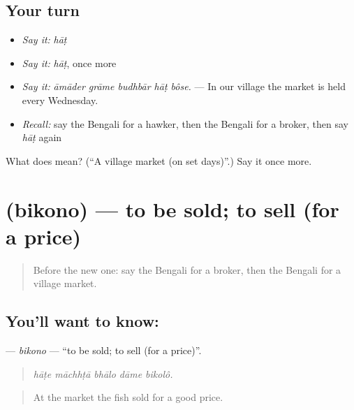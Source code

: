 \subsection*{Your turn}
\begin{itemize}
\raggedright
  \item \emph{Say it:} \emph{hāṭ}
  \item \emph{Say it:} \emph{hāṭ}, once more
  \item \emph{Say it:} \emph{āmāder grāme budhbār hāṭ bôse.} — In our village the market is held every Wednesday.
  \item \emph{Recall:} say the Bengali for a hawker, then the Bengali for a broker, then say \emph{hāṭ} again
\end{itemize}

\begin{tcolorbox}[breakable,colback=teal!4,colframe=teal!35!black,title={Before you move on}]
What does  mean? (\textquotedblleft{}A village market (on set days)\textquotedblright{}.) Say it once more.
\end{tcolorbox}
\section[\texorpdfstring{\bn{বিকোনো} (bikono)}{বিকোনো (bikono)}]{ (bikono) — to be sold; to sell (for a price)}

\label{lesson:BN-C420-bikono}



\begin{quote}
Before the new one: say the Bengali for a broker, then the Bengali for a village market.
\end{quote}

\subsection*{You'll want to know: }
\textbf{} — \emph{bikono} — \textquotedblleft{}to be sold; to sell (for a price)\textquotedblright{}.

\begin{quote}
    
\end{quote}

\begin{quote}
\emph{hāṭe māchhṭā bhālo dāme bikolô.}
\end{quote}

\begin{quote}
At the market the fish sold for a good price.
\end{quote}

